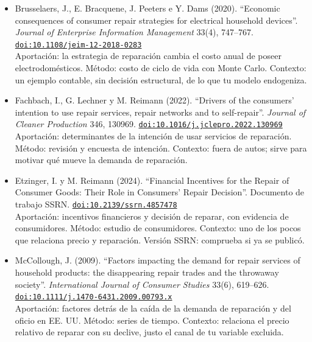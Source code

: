 \documentclass[11pt]{article}
\begin{document}
\begin{itemize}
Aportación: reemplazo de aparatos con determinantes observables y no observables. Método: duración. Contexto: continúa a Fernández (1998) y agrega heterogeneidad no observada.
\item Brusselaers, J., E. Bracquene, J. Peeters e Y. Dams (2020). ``Economic consequences of consumer repair strategies for electrical household devices''. \textit{Journal of Enterprise Information Management} 33(4), 747--767. \href{https://doi.org/10.1108/jeim-12-2018-0283}{\texttt{doi:10.1108/jeim-12-2018-0283}}\\
Aportación: la estrategia de reparación cambia el costo anual de poseer electrodomésticos. Método: costo de ciclo de vida con Monte Carlo. Contexto: un ejemplo contable, sin decisión estructural, de lo que tu modelo endogeniza.
\item Fachbach, I., G. Lechner y M. Reimann (2022). ``Drivers of the consumers’ intention to use repair services, repair networks and to self-repair''. \textit{Journal of Cleaner Production} 346, 130969. \href{https://doi.org/10.1016/j.jclepro.2022.130969}{\texttt{doi:10.1016/j.jclepro.2022.130969}}\\
Aportación: determinantes de la intención de usar servicios de reparación. Método: revisión y encuesta de intención. Contexto: fuera de autos; sirve para motivar qué mueve la demanda de reparación.
\item Etzinger, I. y M. Reimann (2024). ``Financial Incentives for the Repair of Consumer Goods: Their Role in Consumers' Repair Decision''. Documento de trabajo SSRN. \href{https://doi.org/10.2139/ssrn.4857478}{\texttt{doi:10.2139/ssrn.4857478}}\\
Aportación: incentivos financieros y decisión de reparar, con evidencia de consumidores. Método: estudio de consumidores. Contexto: uno de los pocos que relaciona precio y reparación. Versión SSRN: comprueba si ya se publicó.
\item McCollough, J. (2009). ``Factors impacting the demand for repair services of household products: the disappearing repair trades and the throwaway society''. \textit{International Journal of Consumer Studies} 33(6), 619--626. \href{https://doi.org/10.1111/j.1470-6431.2009.00793.x}{\texttt{doi:10.1111/j.1470-6431.2009.00793.x}}\\
Aportación: factores detrás de la caída de la demanda de reparación y del oficio en EE. UU. Método: series de tiempo. Contexto: relaciona el precio relativo de reparar con su declive, justo el canal de tu variable excluida.
\end{itemize}
\end{document}
